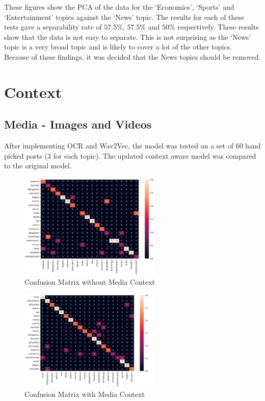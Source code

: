 These figures show the PCA of the data for the `Economics', `Sports' and `Entertainment' topics against the `News' topic. The results for each
of these tests gave a separability rate of $57.5\%$, $57.5\%$ and $50\%$ respectively. These results show that the data is not easy to separate.
This is not surprising as the `News' topic is a very broad topic and is likely to cover a lot of the other topics.\\
Because of these findings, it was decided that the News topics should be removed.
\section{Context}
\subsection{Media - Images and Videos}
After implementing OCR and Wav2Vec, the model was tested on a set of 60 hand picked posts (3 for each topic). The updated context aware
model was compared to the original model.
\begin{figure}
    \centering
    \includegraphics[width=0.6\textwidth]{../images/confusion/Complete-no-media-confusion.png}
    \caption{Confusion Matrix without Media Context}
    \label{fig:confusion}
\end{figure}
\begin{figure}
    \centering
    \includegraphics[width=0.6\textwidth]{../images/confusion/Complete-Model-test.png}
    \caption{Confusion Matrix with Media Context}
    \label{fig:media}
\end{figure}

